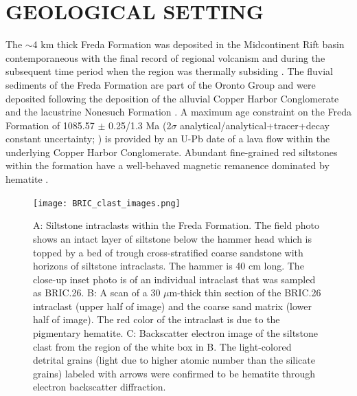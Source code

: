 \documentclass[11pt,letterpaper]{article}
\begin{document}
\section*{GEOLOGICAL SETTING}

The $\sim$4 km thick Freda Formation was deposited in the Midcontinent Rift basin contemporaneous with the final record of regional volcanism and during the subsequent time period when the region was thermally subsiding \citep{Cannon1992a}. The fluvial sediments of the Freda Formation are part of the Oronto Group and were deposited following the deposition of the alluvial Copper Harbor Conglomerate and the lacustrine Nonesuch Formation \citep{Ojakangas2001a}. A maximum age constraint on the Freda Formation of 1085.57 $\pm$ 0.25/1.3 Ma (2$\sigma$ analytical/analytical+tracer+decay constant uncertainty; \citealp{Fairchild2017a}) is provided by an U-Pb date of a lava flow within the underlying Copper Harbor Conglomerate. Abundant fine-grained red siltstones within the formation have a well-behaved magnetic remanence dominated by hematite \citep{Henry1977a}.

\begin{figure}[!ht]
\centering
\noindent\texttt{[image: BRIC\_clast\_images.png]}
\caption{\small{A: Siltstone intraclasts within the Freda Formation. The field photo shows an intact layer of siltstone below the hammer head which is topped by a bed of trough cross-stratified coarse sandstone with horizons of siltstone intraclasts. The hammer is 40 cm long. The close-up inset photo is of an individual intraclast that was sampled as BRIC.26. B: A scan of a 30 $\mu$m-thick thin section of the BRIC.26 intraclast (upper half of image) and the coarse sand matrix (lower half of image). The red color of the intraclast is due to the pigmentary hematite. C: Backscatter electron image of the siltstone clast from the region of the white box in B. The light-colored detrital grains (light due to higher atomic number than the silicate grains) labeled with arrows were confirmed to be hematite through electron backscatter diffraction.}}
\label{fig:intraclast_images}
\end{figure}
\end{document}
